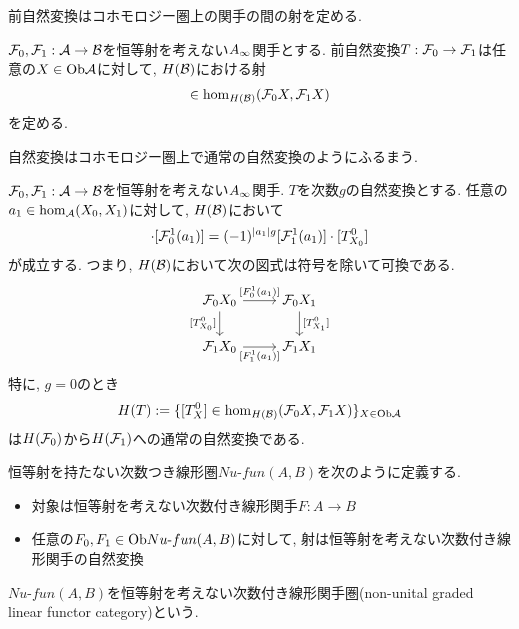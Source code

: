 \documentclass[uplatex, a4paper, 14Q, dvipdfmx]{jsarticle}
\begin{document}
前自然変換はコホモロジー圏上の関手の間の射を定める. 

\begin{lemma}
  $\mathcal{F}_0,\mathcal{F}_1 : \mathcal{A} \to \mathcal{B}$を恒等射を考えない$A_{\infty}$関手とする. 
  前自然変換$T : \mathcal{F}_0 \to \mathcal{F}_1$は任意の$X \in \mathrm{Ob}\mathcal{A}$に対して, $H(\mathcal{B})$における射
  \begin{align*}
    [T^0_X] \in \hom_{H(\B)}(\F_0X,\F_1X)
  \end{align*}
  を定める. 
\end{lemma}

自然変換はコホモロジー圏上で通常の自然変換のようにふるまう. 

\begin{lemma} \label{prop_pre_natural_transformation_induces_natural_transformation}
  $\mathcal{F}_0,\mathcal{F}_1 : \mathcal{A} \to \mathcal{B}$を恒等射を考えない$A_{\infty}$関手. $T$を次数$g$の自然変換とする. 
  任意の$a_1 \in \hom_{\mathcal{A}}(X_0,X_1)$に対して, $H(\mathcal{B})$において
  \begin{align*}
    [T^0_{X_1}] \cdot [\F_0^1(a_1)]
    = (-1)^{|a_1|g} [\F_1^1(a_1)] \cdot [T^0_{X_0}]
  \end{align*}
  が成立する. 
  つまり, $H(\mathcal{B})$において次の図式は符号を除いて可換である. 
  \[\begin{tikzcd}
    {\F_0 X_0} & {\F_0 X_1} \\
    {\F_1 X_0} & {\F_1 X_1}
    \arrow["{[F^1_0(a_1)]}", from=1-1, to=1-2]
    \arrow["{[T^0_{X_1}]}", from=1-2, to=2-2]
    \arrow["{[T^0_{X_0}]}"', from=1-1, to=2-1]
    \arrow["{[F^1_1(a_1)]}"', from=2-1, to=2-2]
  \end{tikzcd}\]
  特に, $g=0$のとき
  \begin{align*}
    H(T) := \{[T^0_X] \in \hom_{H(\mathcal{B})}(\mathcal{F}_0 X,\mathcal{F}_1 X) \}_{X \in \mathrm{Ob}\mathcal{A}}
  \end{align*}
  は$H(\mathcal{F}_0)$から$H(\mathcal{F}_1)$への通常の自然変換である. 
\end{lemma}

\begin{definition}[恒等射を考えない次数付き線形関手圏]
  恒等射を持たない次数つき線形圏$Nu\text{-}fun(A,B)$を次のように定義する. 
  \begin{itemize}
    \item 対象は恒等射を考えない次数付き線形関手$F : A \to B$
    \item 任意の$F_0, F_1 \in \mathrm{Ob} Nu\text{-}fun(A,B)$に対して, 射は恒等射を考えない次数付き線形関手の自然変換
  \end{itemize}
  $Nu\text{-}fun(A,B)$を恒等射を考えない次数付き線形関手圏(non-unital graded linear functor category)という. 
\end{definition}
\end{document}
